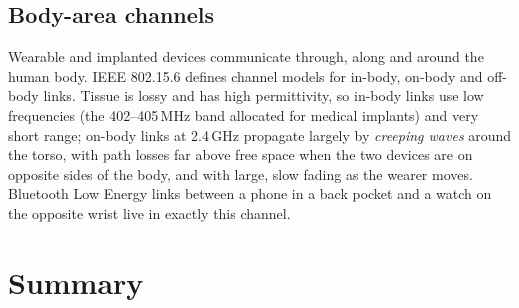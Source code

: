 
\subsection{Body-area channels}

Wearable and implanted devices communicate through, along and around the human body. IEEE 802.15.6
defines channel models for in-body, on-body and off-body links. Tissue is lossy and has high
permittivity, so in-body links use low frequencies (the 402--405\,MHz band allocated for medical
implants) and very short range; on-body links at 2.4\,GHz propagate largely by \emph{creeping waves}
around the torso, with path losses far above free space when the two devices are on opposite sides
of the body, and with large, slow fading as the wearer moves. Bluetooth Low Energy links between a
phone in a back pocket and a watch on the opposite wrist live in exactly this channel.

\section{Summary}
\label{sec:ch11:summary}




